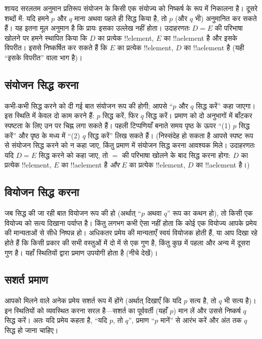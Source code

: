 \documentclass[../../../include/open-logic-section]{subfiles}
\begin{document}
शायद सरलतम अनुमान प्रतिरूप संयोजन के किसी एक संयोज्य को निष्कर्ष के रूप में
निकालना है। दूसरे शब्दों में: यदि हमने $p$ और $q$ माना अथवा पहले ही सिद्ध
किया है, तो $p$ (और $q$ भी) अनुमानित कर सकते हैं। यह इतना मूल अनुमान है कि
प्रायः इसका उल्लेख नहीं होता। उदाहरणतः $D=E$ की परिभाषा खोलने पर हमने
स्थापित किया कि $D$ का प्रत्येक !!{element}, $E$ का !!a{element} है और इसके
विपरीत। इससे निष्कर्षित कर सकते हैं कि $E$ का प्रत्येक !!{element}, $D$ का
!!a{element} है (यही ``इसके विपरीत'' वाला भाग है)।

\subsection{संयोजन सिद्ध करना}

कभी-कभी सिद्ध करने को दी गई बात संयोजन रूप की होगी; आपसे ``$p$ और $q$
सिद्ध करें'' कहा जाएगा। इस स्थिति में केवल दो काम करने हैं: $p$ सिद्ध करें,
फिर $q$ सिद्ध करें। प्रमाण को दो अनुभागों में बाँटकर स्पष्टता के लिए उन पर
चिह्न लगा सकते हैं। पहली टिप्पणियाँ बनाते समय पृष्ठ के ऊपर ``(1) $p$ सिद्ध
करें'' और पृष्ठ के मध्य में ``(2) $q$ सिद्ध करें'' लिख सकते हैं। (निस्संदेह
हो सकता है आपसे स्पष्ट रूप से संयोजन सिद्ध करने को न कहा जाए, किंतु प्रमाण
में संयोजन सिद्ध करना आवश्यक मिले। उदाहरणतः यदि $D=E$ सिद्ध करने को कहा जाए,
तो $=$ की परिभाषा खोलने के बाद सिद्ध करना होगा: $D$ का प्रत्येक
!!{element}, $E$ का !!a{element} है \emph{और} $E$ का प्रत्येक !!{element},
$D$ का !!a{element} है।)

\subsection{वियोजन सिद्ध करना}

जब सिद्ध की जा रही बात वियोजन रूप की हो (अर्थात् ``$p$ अथवा $q$'' रूप का
कथन हो), तो किसी एक वियोज्य को सत्य दिखाना पर्याप्त है। किंतु लगभग कभी ऐसा
नहीं होता कि कोई एक वियोज्य आपके प्रमेय की मान्यताओं से सीधे निष्पन्न हो।
अधिकतर प्रमेय की मान्यताएँ स्वयं वियोजक होती हैं, या आप दिखा रहे होते हैं कि
किसी प्रकार की सभी वस्तुओं में दो में से एक गुण है, किंतु कुछ में पहला और
अन्य में दूसरा गुण है। यहाँ स्थितियों द्वारा प्रमाण उपयोगी होता है (नीचे
देखें)।

\subsection{सशर्त प्रमाण}

आपको मिलने वाले अनेक प्रमेय सशर्त रूप में होंगे (अर्थात् दिखाएँ कि यदि $p$
सत्य है, तो $q$ भी सत्य है)। इन स्थितियों को व्यवस्थित करना सरल है---सशर्त
का पूर्ववर्ती (यहाँ $p$) मान लें और उससे निष्कर्ष $q$ सिद्ध करें। अतः यदि
प्रमेय कहता है, ``यदि $p$, तो $q$'', प्रमाण ``$p$ मानें'' से आरंभ करें और
अंत तक $q$ सिद्ध हो जाना चाहिए।
\end{document}
